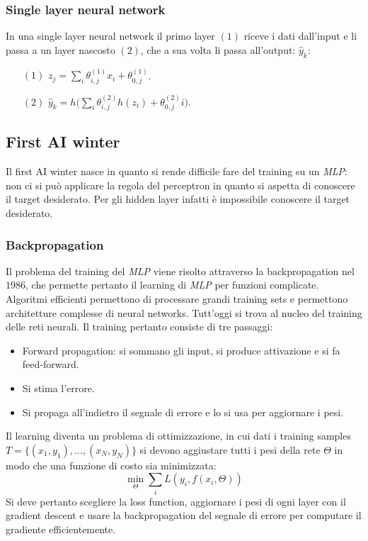 		\subsubsection{Single layer neural network}
		In una single layer neural network il primo layer $(1)$ riceve i dati dall'input e li passa a un layer nascosto $(2)$, che a sua volta li passa all'output: $\hat{y}_k$:
		\begin{itemize}
			\item[$(1)$] $z_j = \sum\limits_i\theta^{(1)}_{i,j}x_i + \theta_{0,j}^{(1)}$.
			\item[$(2)$] $\hat{y}_k = h\bigl(\sum\limits_i\theta^{(2)}_{i,j}h(z_i)+\theta^{(2)}_{0,j}i\bigr)$.
			\end{itemize}

	\subsection{First AI winter}
	Il first AI winter nasce in quanto si rende difficile fare del training su un \emph{MLP}: non ci si pu\`o applicare la regola del perceptron in quanto si aspetta di conoscere il target desiderato.
	Per gli hidden layer infatti \`e impossibile conoscere il target desiderato.

		\subsubsection{Backpropagation}
		Il problema del training del \emph{MLP} viene risolto attraverso la backpropagation nel $1986$, che permette pertanto il learning di \emph{MLP} per funzioni complicate.
		Algoritmi efficienti permettono di processare grandi training sets e permettono architetture complesse di neural networks.
		Tutt'oggi si trova al nucleo del training delle reti neurali.
		Il training pertanto consiste di tre passaggi:
		\begin{multicols}{2}
			\begin{itemize}
				\item Forward propagation: si sommano gli input, si produce attivazione e si fa feed-forward.
				\item Si stima l'errore.
				\item Si propaga all'indietro il segnale di errore e lo si usa per aggiornare i pesi.
			\end{itemize}
		\end{multicols}
		Il learning diventa un problema di ottimizzazione, in cui dati i training samples $T=\{(x_1,y_1),\dots,(x_N,y_N)\}$ si devono aggiustare tutti i pesi della rete $\Theta$ in modo che una funzione di costo sia minimizzata:
		$$\min_\Theta\sum\limits_i L(y_i, f(x_i,\Theta))$$
		Si deve pertanto scegliere la loss function, aggiornare i pesi di ogni layer con il gradient descent e usare la backpropagation del segnale di errore per computare il gradiente efficientemente.

